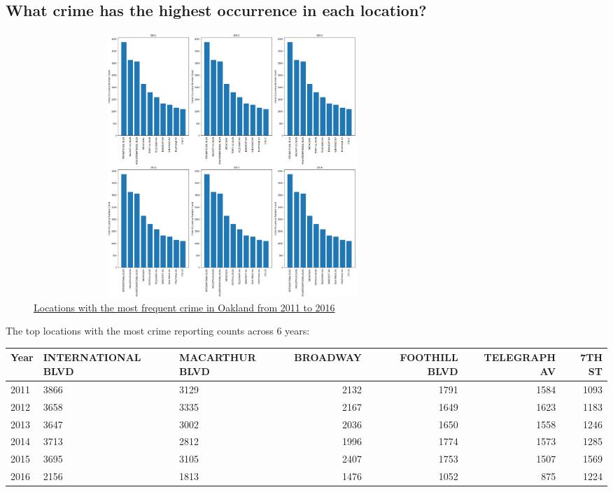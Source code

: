 \documentclass{article} %
\begin{document}
\subsection{What crime has the highest occurrence in each location?}


\begin{figure}[H]
	\begin{center}
		\includegraphics[height=10cm, width=15cm]{2.png}
	\end{center}
	\caption{\hyperref[appendix:plot1]{Locations with the most frequent crime in Oakland from 2011 to 2016}}
\end{figure}

The top locations with the most crime reporting counts across 6 years:

\begin{center}
\begin{tabular}{|l|p{3cm}|p{2.2cm}|r|r|r|r|}
	\toprule
	Year & INTERNATIONAL BLVD &  MACARTHUR BLVD &  BROADWAY &  FOOTHILL BLVD &  TELEGRAPH AV &  7TH ST \\
	\midrule
	2011 &                3866 &            3129 &      2132 &           1791 &          1584 &    1093 \\
	2012 &                3658 &            3335 &      2167 &           1649 &          1623 &    1183 \\
	2013 &                3647 &            3002 &      2036 &           1650 &          1558 &    1246 \\
	2014 &                3713 &            2812 &      1996 &           1774 &          1573 &    1285 \\
	2015 &                3695 &            3105 &      2407 &           1753 &          1507 &    1569 \\
	2016 &                2156 &            1813 &      1476 &           1052 &           875 &    1224 \\
	\bottomrule
\end{tabular}
\end{center}
\end{document}
